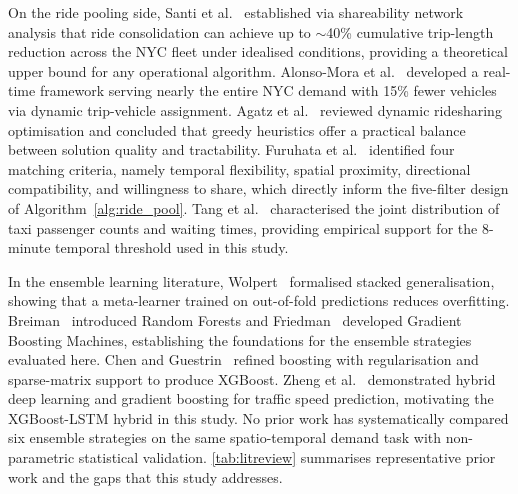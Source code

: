 \documentclass[a4paper,fleqn]{cas-dc}
\begin{document}
On the ride pooling side, Santi et al.~\cite{santi2014quantifying} established via shareability network analysis that ride consolidation can achieve up to $\sim$40\% cumulative trip-length reduction across the NYC fleet under idealised conditions, providing a theoretical upper bound for any operational algorithm.  Alonso-Mora et al.~\cite{alonso2017demand} developed a real-time framework serving nearly the entire NYC demand with 15\% fewer vehicles via dynamic trip-vehicle assignment.  Agatz et al.~\cite{agatz2012ridesharing} reviewed dynamic ridesharing optimisation and concluded that greedy heuristics offer a practical balance between solution quality and tractability.  Furuhata et al.~\cite{furuhata2013ridesharing} identified four matching criteria, namely temporal flexibility, spatial proximity, directional compatibility, and willingness to share, which directly inform the five-filter design of Algorithm~\ref{alg:ride_pool}.  Tang et al.~\cite{tang2018joint} characterised the joint distribution of taxi passenger counts and waiting times, providing empirical support for the 8-minute temporal threshold used in this study.

In the ensemble learning literature, Wolpert~\cite{wolpert1992stacking} formalised stacked generalisation, showing that a meta-learner trained on out-of-fold predictions reduces overfitting.  Breiman~\cite{breiman2001rf} introduced Random Forests and Friedman~\cite{friedman2001gbm} developed Gradient Boosting Machines, establishing the foundations for the ensemble strategies evaluated here.  Chen and Guestrin~\cite{chen2016xgboost} refined boosting with regularisation and sparse-matrix support to produce XGBoost.  Zheng et al.~\cite{zheng2020hybrid} demonstrated hybrid deep learning and gradient boosting for traffic speed prediction, motivating the XGBoost-LSTM hybrid in this study.  No prior work has systematically compared six ensemble strategies on the same spatio-temporal demand task with non-parametric statistical validation.  \autoref{tab:litreview} summarises representative prior work and the gaps that this study addresses.
\end{document}
